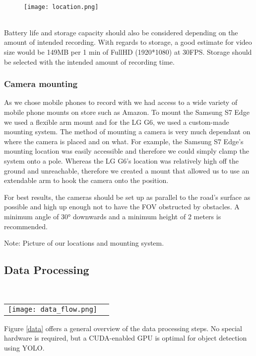 \ \\ 
\begin{figure}[h]
\texttt{[image: location.png]}
\centering 
\end{figure}
\label{Camera location}

\ \\
Battery life and storage capacity should also be considered depending on the amount of intended recording. 
With regards to storage, a good estimate for video size would be 149MB per 1 min of FullHD (1920*1080) at 30FPS. Storage should be selected
with the intended amount of recording time.

\subsubsection{Camera mounting}

As we chose mobile phones to record with we had access to a wide variety of mobile phone mounts on store such as Amazon.
To mount the Samsung S7 Edge we used a flexible arm mount and for the LG G6, we used a custom-made mounting system.
The method of mounting a camera is very much dependant on where the camera is placed and on what. For example, the Samsung S7 Edge's
mounting location was easily accessible and therefore we could simply clamp the system onto a pole. Whereas the LG G6's location was relatively 
high off the ground and unreachable, therefore we created a mount that allowed us to use an extendable arm to hook the camera onto the position.

For best results, the cameras should be set up as parallel to the road's surface as possible and high up enough not to have the FOV obstructed by obstacles.
A minimum angle of 30° downwards and a minimum height of 2 meters is recommended.

Note: Picture of our locations and mounting system.

\subsection{Data Processing}

\ \\ 
\noindent
\begin{tabular}{@{}cc}
\texttt{[image: data\_flow.png]} 
\end{tabular}
\label{data}


Figure \ref{data} offers a general overview of the data processing steps. No special hardware is required, but a CUDA-enabled GPU is optimal for object detection using YOLO.
\ \\
